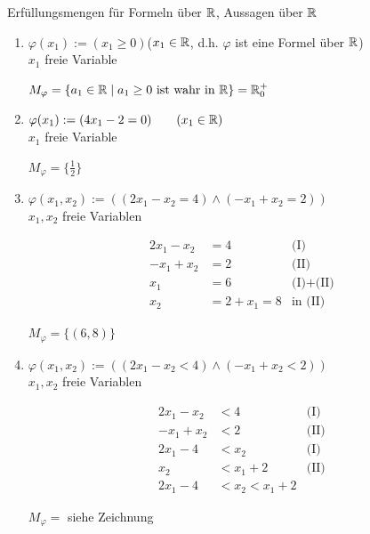 \clearpage
\Bsp Erfüllungsmengen für Formeln über $\mathbb{R}$, Aussagen über $\mathbb{R}$
\begin{enumerate}
	\item $\varphi(x_1):=(x_1\ge 0)$\qquad ($x_1\in\mathbb{R}$, d.h. $\varphi$ ist eine Formel über $\mathbb{R}$)\\
	$x_1$ freie Variable
	
	$M_\varphi = \{a_1\in\mathbb{R}\mid a_1\ge 0\text{ ist wahr in }\mathbb{R}\} = \mathbb{R}_0^+$
	
	\item $\varphi(x_1):=(4x_1-2 = 0)\qquad(x_1\in\mathbb{R})$\\
	$x_1$ freie Variable
	
	$M_\varphi = \{\frac{1}{2}\}$
	
	\item $\varphi(x_1, x_2):=((2x_1-x_2=4)\land(-x_1+x_2=2))$\\
	$x_1,x_2$ freie Variablen
	
	\begin{align*}
	2x_1-x_2&=4 &\text{(I)}\\
	-x_1+x_2&=2 &\text{(II)}\\
	\hline
	x_1 &= 6 &\text{(I)+(II)}\\
	x_2 &= 2+x_1 = 8 &\text{in (II)}
	\end{align*}
	
	$M_\varphi = \{(6,8)\}$
	
	\item $\varphi(x_1, x_2):=((2x_1-x_2<4)\land(-x_1+x_2<2))$\\
	$x_1,x_2$ freie Variablen
	
	\begin{align*}
	2x_1-x_2&<4 &\text{(I)}\\
	-x_1+x_2&<2 &\text{(II)}\\
	\hline
	2x_1-4 &< x_2 &\text{(I)}\\
	x_2 &< x_1 + 2 &\text{(II)}\\
	\hline
	2x_1-4 &< x_2 < x_1 + 2
	\end{align*}
	
	$M_\varphi = $ siehe Zeichnung
	

\end{enumerate}
